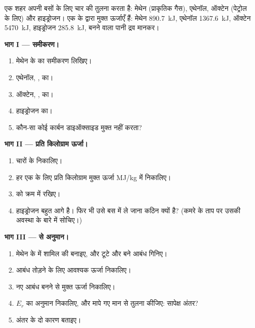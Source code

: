 \begin{problem}
\label{pb:g11:reaction-energy:1}
एक शहर अपनी बसों के लिए चार  की तुलना करता है: मेथेन (प्राकृतिक गैस), एथेनॉल,
ऑक्टेन (पेट्रोल के लिए) और हाइड्रोजन। एक  के  द्वारा मुक्त
ऊर्जाएँ हैं: मेथेन \qty{890.7}{kJ}, एथेनॉल
\qty{1367.6}{kJ}, ऑक्टेन \qty{5470}{kJ}, हाइड्रोजन \qty{285.8}{kJ}, बनने वाला
पानी द्रव मानकर।

\medskip
\noindent\textbf{भाग I ---  समीकरण।}
\begin{enumerate}
  \item मेथेन के  का समीकरण लिखिए।
  \item एथेनॉल, , का।
  \item ऑक्टेन, , का।
  \item हाइड्रोजन का।
  \item कौन-सा  कोई कार्बन डाइऑक्साइड मुक्त नहीं करता?
\end{enumerate}

\medskip
\noindent\textbf{भाग II --- प्रति किलोग्राम ऊर्जा।}
\begin{enumerate}[resume]
  \item चारों  के  निकालिए।
  \item हर एक के लिए प्रति किलोग्राम मुक्त ऊर्जा
        \si{MJ/kg} में निकालिए।
  \item {} को क्रम में रखिए।
  \item हाइड्रोजन बहुत आगे है। फिर भी उसे बस में ले जाना कठिन क्यों
        है? (कमरे के ताप पर उसकी अवस्था के बारे में सोचिए।)
\end{enumerate}

\medskip
\noindent\textbf{भाग III ---  से अनुमान।}
\begin{enumerate}[resume]
  \item मेथेन के  में शामिल  की  बनाइए,
        और टूटे और बने आबंध गिनिए।
  \item आबंध तोड़ने के लिए आवश्यक ऊर्जा निकालिए।
  \item नए आबंध बनने से मुक्त ऊर्जा निकालिए।
  \item $E_r$ का अनुमान निकालिए, और मापे गए मान से
        तुलना कीजिए: सापेक्ष अंतर?
  \item अंतर के दो कारण बताइए।
\end{enumerate}


\end{problem}

